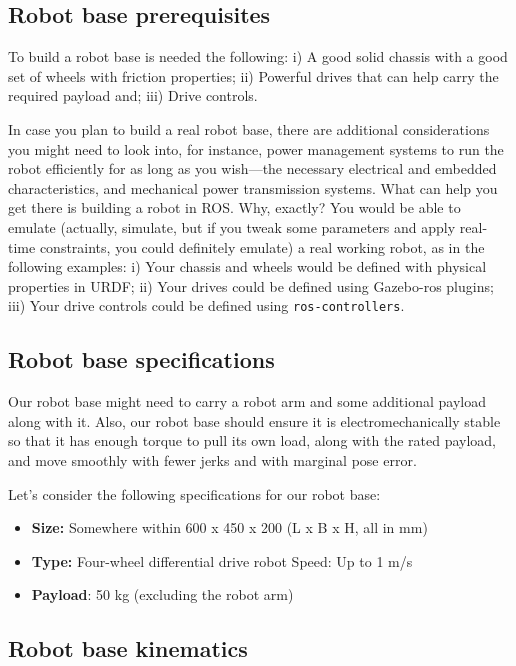 \documentclass[letterpaper,pdftex]{article}
\begin{document}
\subsection{Robot base prerequisites}

To build a robot base is needed the following: i) A good solid chassis with a good set of wheels with friction properties; ii) Powerful drives that can help carry the required payload and; iii) Drive controls.

In case you plan to build a real robot base, there are additional considerations you might need to look into, for instance, power management systems to run the robot efficiently for as long as you wish—the necessary electrical and embedded characteristics, and mechanical power transmission systems. What can help you get there is building a robot in ROS. Why, exactly? You would be able to emulate (actually, simulate, but if you tweak some parameters and apply real-time constraints, you could definitely emulate) a real working robot, as in the following examples: i) Your chassis and wheels would be defined with physical properties in URDF; ii) Your drives could be defined using Gazebo-ros plugins; iii) Your drive controls could be defined using \verb|ros-controllers|.

\subsection{Robot base specifications}

Our robot base might need to carry a robot arm and some additional payload along with it. Also, our robot base should ensure it is electromechanically stable so that it has enough torque to pull its own load, along with the rated payload, and move smoothly with fewer jerks and with marginal pose error.

Let's consider the following specifications for our robot base:

\begin{itemize}
\item \textbf{Size:} Somewhere within 600 x 450 x 200 (L x B x H, all in mm)
\item \textbf{Type:} Four-wheel differential drive robot Speed: Up to 1 m/s
\item \textbf{Payload}: 50 kg (excluding the robot arm)
\end{itemize}

\subsection{Robot base kinematics}
\end{document}

